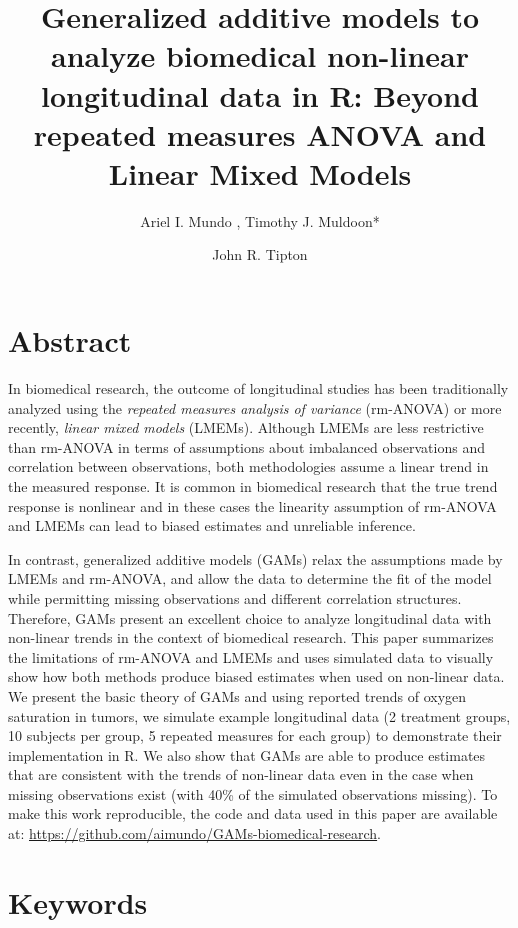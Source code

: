 \documentclass[
]{article}
\author{Ariel I. Mundo \orcidaffila{}, Timothy J. Muldoon*}
\affil{Department of Biomedical Engineering, University of Arkansas, Fayetteville, AR, USA}
\affil{\normalfont {tmuldoon@uark.edu}}
\author{John R. Tipton \orcidaffilb{}}
\affil{Department of Mathematical Sciences, University of Arkansas, Fayetteville, AR, USA}
\title{\textbf{Generalized additive models to analyze biomedical non-linear longitudinal data in R: Beyond repeated measures ANOVA and Linear Mixed Models}}
\date{\vspace{-2.5em}}
\begin{document}
\maketitle

\hypertarget{abstract}{%
\section{Abstract}\label{abstract}}

In biomedical research, the outcome of longitudinal studies has been traditionally analyzed using the \emph{repeated measures analysis of variance} (rm-ANOVA) or more recently, \emph{linear mixed models} (LMEMs). Although LMEMs are less restrictive than rm-ANOVA in terms of assumptions about imbalanced observations and correlation between observations, both methodologies assume a linear trend in the measured response. It is common in biomedical research that the true trend response is nonlinear and in these cases the linearity assumption of rm-ANOVA and LMEMs can lead to biased estimates and unreliable inference.

In contrast, generalized additive models (GAMs) relax the assumptions made by LMEMs and rm-ANOVA, and allow the data to determine the fit of the model while permitting missing observations and different correlation structures. Therefore, GAMs present an excellent choice to analyze longitudinal data with non-linear trends in the context of biomedical research. This paper summarizes the limitations of rm-ANOVA and LMEMs and uses simulated data to visually show how both methods produce biased estimates when used on non-linear data. We present the basic theory of GAMs and using reported trends of oxygen saturation in tumors, we simulate example longitudinal data (2 treatment groups, 10 subjects per group, 5 repeated measures for each group) to demonstrate their implementation in R. We also show that GAMs are able to produce estimates that are consistent with the trends of non-linear data even in the case when missing observations exist (with 40\% of the simulated observations missing). To make this work reproducible, the code and data used in this paper are available at: \url{https://github.com/aimundo/GAMs-biomedical-research}.

\hypertarget{keywords}{%
\section*{Keywords}\label{keywords}}
\end{document}
